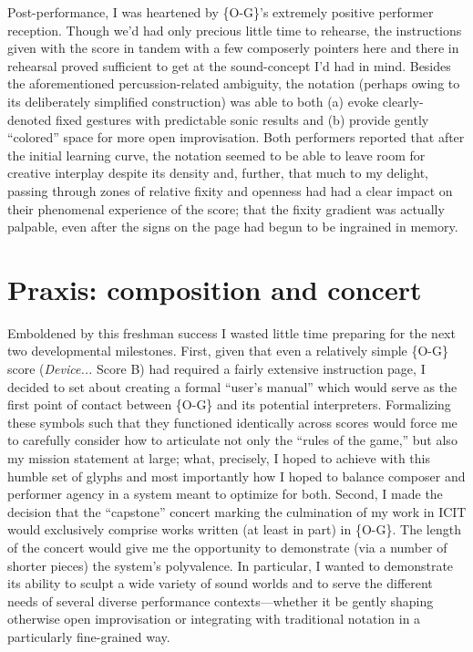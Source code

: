     Post-performance, I was heartened by \{O-G\}'s extremely positive performer reception. Though we'd had only precious little time to rehearse, the instructions given with the score in tandem with a few composerly pointers here and there in rehearsal proved sufficient to get at the sound-concept I'd had in mind. Besides the aforementioned percussion-related ambiguity, the notation (perhaps owing to its deliberately simplified construction) was able to both (a) evoke clearly-denoted fixed gestures with predictable sonic results and (b) provide gently ``colored'' space for more open improvisation. Both performers reported that after the initial learning curve, the notation seemed to be able to leave room for creative interplay despite its density and, further, that much to my delight, passing through zones of relative fixity and openness had had a clear impact on their phenomenal experience of the score; that the fixity gradient was actually palpable, even after the signs on the page had begun to be ingrained in memory.

\section{Praxis: composition and concert}


    Emboldened by this freshman success I wasted little time preparing for the next two developmental milestones. First, given that even a relatively simple \{O-G\} score (\textit{Device...} Score B) had required a fairly extensive instruction page, I decided to set about creating a formal ``user's manual'' which would serve as the first point of contact between \{O-G\} and its potential interpreters. Formalizing these symbols such that they functioned identically across scores would force me to carefully consider how to articulate not only the ``rules of the game,'' but also my mission statement at large; what, precisely, I hoped to achieve with this humble set of glyphs and most importantly how I hoped to balance composer and performer agency in a system meant to optimize for both. Second, I made the decision that the ``capstone'' concert marking the culmination of my work in ICIT would exclusively comprise works written (at least in part) in \{O-G\}. The length of the concert would give me the opportunity to demonstrate (via a number of shorter pieces) the system's polyvalence. In particular, I wanted to demonstrate its ability to sculpt a wide variety of sound worlds and to serve the different needs of several diverse performance contexts---whether it be gently shaping otherwise open improvisation or integrating with traditional notation in a particularly fine-grained way. 

